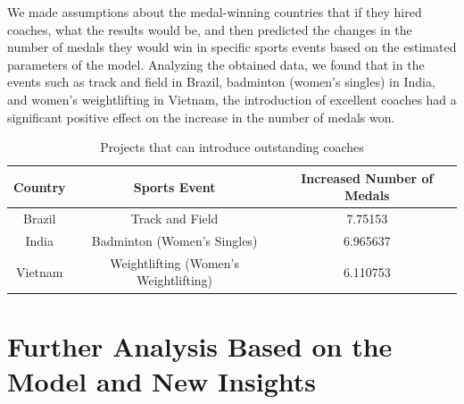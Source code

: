 \documentclass{mcmthesis}  %
\begin{document}
\begin{itemize}
We made assumptions about the medal-winning countries that if they hired coaches, what the results would be, and then predicted the changes in the number of medals they would win in specific sports events based on the estimated parameters of the model. Analyzing the obtained data, we found that in the events such as track and field in Brazil, badminton (women's singles) in India, and women's weightlifting in Vietnam, the introduction of excellent coaches had a significant positive effect on the increase in the number of medals won.
\begin{table}[H]  %
\caption{Projects that can introduce outstanding coaches}  %
\tabcolsep 10pt %
\begin{tabular*}{\textwidth}{ccc}  %
\toprule  %
Country & Sports Event & Increased Number of Medals\\
\midrule  %
Brazil & Track and Field & 7.75153\\
\midrule  %
India & Badminton (Women's Singles) & 6.965637\\
\midrule  %
Vietnam & Weightlifting (Women's Weightlifting) & 6.110753\\
\bottomrule  %
\end{tabular*}  %
\end{table}  %
\end{itemize}  %

\section{Further Analysis Based on the Model and New Insights}  %
\end{document}
